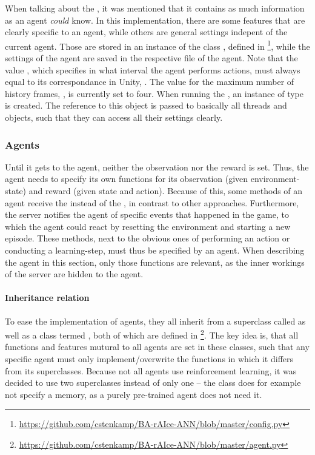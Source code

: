 When talking about the , it was mentioned that it contains as much information as an agent \textit{could} know. In this implementation, there are some features that are clearly specific to an agent, while others are general settings indepent of the current agent. Those are stored in an instance of the class , defined in \footnote{\url{https://github.com/cstenkamp/BA-rAIce-ANN/blob/master/config.py}}, while the settings of the agent are saved in the respective file of the agent. Note that the value , which specifies in what interval the agent performs actions, must always equal to its correspondance in Unity, . The value for the maximum number of history frames, , is currently set to four. When running the , an instance  of type  is created. The reference to this object is passed to basically all threads and objects, such that they can access all their settings clearly.


\subsubsection{Agents}

Until it gets to the agent, neither the observation nor the reward is set. Thus, the agent needs to specify its own functions for its observation (given environment-state) and reward (given state and action). Because of this, some methods of an agent receive the  instead of the , in contrast to other approaches. Furthermore, the server notifies the agent of specific events that happened in the game, to which the agent could react by resetting the environment and starting a new episode. These methods, next to the obvious ones of performing an action or conducting a learning-step, must thus be specified by an agent. When describing the agent in this section, only those functions are relevant, as the inner workings of the server are hidden to the agent.

\paragraph{Inheritance relation}

To ease the implementation of agents, they all inherit from a superclass called  as well as a class termed , both of which are defined in \footnote{\url{https://github.com/cstenkamp/BA-rAIce-ANN/blob/master/agent.py}}. The key idea is, that all functions and features mutural to all agents are set in these classes, such that any specific agent must only implement/overwrite the functions in which it differs from its superclasses. Because not all agents use reinforcement learning, it was decided to use two superclasses instead of only one -- the class  does for example not specify a memory, as a purely pre-trained agent does not need it.

